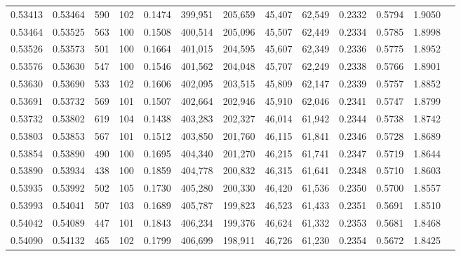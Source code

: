 \begin{tabular}{rrrrrrrrrrrrr}
0.53413 & 0.53464 &   590 & 102 &                                     0.1474 & 399,951 & 205,659 &  45,407 &  62,549 & 0.2332 & 0.5794 & 1.9050 \\
0.53464 & 0.53525 &   563 & 100 &                                     0.1508 & 400,514 & 205,096 &  45,507 &  62,449 & 0.2334 & 0.5785 & 1.8998 \\
0.53526 & 0.53573 &   501 & 100 &                                     0.1664 & 401,015 & 204,595 &  45,607 &  62,349 & 0.2336 & 0.5775 & 1.8952 \\
0.53576 & 0.53630 &   547 & 100 &                                     0.1546 & 401,562 & 204,048 &  45,707 &  62,249 & 0.2338 & 0.5766 & 1.8901 \\
0.53630 & 0.53690 &   533 & 102 &                                     0.1606 & 402,095 & 203,515 &  45,809 &  62,147 & 0.2339 & 0.5757 & 1.8852 \\
0.53691 & 0.53732 &   569 & 101 &                                     0.1507 & 402,664 & 202,946 &  45,910 &  62,046 & 0.2341 & 0.5747 & 1.8799 \\
0.53732 & 0.53802 &   619 & 104 &                                     0.1438 & 403,283 & 202,327 &  46,014 &  61,942 & 0.2344 & 0.5738 & 1.8742 \\
0.53803 & 0.53853 &   567 & 101 &                                     0.1512 & 403,850 & 201,760 &  46,115 &  61,841 & 0.2346 & 0.5728 & 1.8689 \\
0.53854 & 0.53890 &   490 & 100 &                                     0.1695 & 404,340 & 201,270 &  46,215 &  61,741 & 0.2347 & 0.5719 & 1.8644 \\
0.53890 & 0.53934 &   438 & 100 &                                     0.1859 & 404,778 & 200,832 &  46,315 &  61,641 & 0.2348 & 0.5710 & 1.8603 \\
0.53935 & 0.53992 &   502 & 105 &                                     0.1730 & 405,280 & 200,330 &  46,420 &  61,536 & 0.2350 & 0.5700 & 1.8557 \\
0.53993 & 0.54041 &   507 & 103 &                                     0.1689 & 405,787 & 199,823 &  46,523 &  61,433 & 0.2351 & 0.5691 & 1.8510 \\
0.54042 & 0.54089 &   447 & 101 &                                     0.1843 & 406,234 & 199,376 &  46,624 &  61,332 & 0.2353 & 0.5681 & 1.8468 \\
0.54090 & 0.54132 &   465 & 102 &                                     0.1799 & 406,699 & 198,911 &  46,726 &  61,230 & 0.2354 & 0.5672 & 1.8425 \\

\end{tabular}
